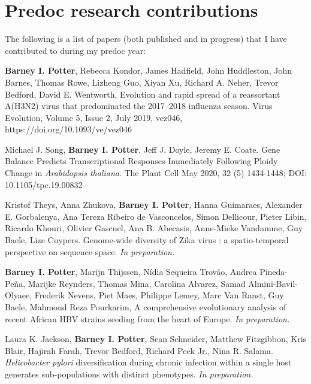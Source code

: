 \chapter{Predoc research contributions}
\label{ch:myappendix}

The following is a list of papers (both published and in progress) that I have contributed to during my predoc year:

\textbf{Barney I. Potter}, Rebecca Kondor, James Hadfield, John Huddleston, John Barnes, Thomas Rowe, Lizheng Guo, Xiyan Xu, Richard A. Neher, Trevor Bedford, David E. Wentworth, Evolution and rapid spread of a reassortant A(H3N2) virus that predominated the 2017–2018 influenza season. Virus Evolution, Volume 5, Issue 2, July 2019, vez046, https://doi.org/10.1093/ve/vez046

Michael J. Song, \textbf{Barney I. Potter}, Jeff J. Doyle, Jeremy E. Coate. Gene Balance Predicts Transcriptional Responses Immediately Following Ploidy Change in \textit{Arabidopsis thaliana}. The Plant Cell May 2020, 32 (5) 1434-1448; DOI: 10.1105/tpc.19.00832

Kristof Theys, Anna Zhukova, \textbf{Barney I. Potter}, Hanna Guimaraes, Alexander E. Gorbalenya, Ana Tereza Ribeiro de Vasconcelos, Simon Dellicour, Pieter Libin, Ricardo Khouri, Olivier Gascuel, Ana B. Abecasis, Anne-Mieke Vandamme, Guy Baele, Lize Cuypers. Genome-wide diversity of Zika virus : a spatio-temporal perspective on sequence space. \textit{In preparation.}

\textbf{Barney I. Potter}, Marijn Thijssen, N\'{i}dia Sequeira Trov\~{a}o,  Andrea Pineda-Pe\~{n}a, Marijke Reynders, Thomas Mina, Carolina Alvarez, Samad Almini-Bavil-Olyaee, Frederik Nevens, Piet Maes, Philippe Lemey, Marc Van Ranst, Guy Baele, Mahmoud Reza Pourkarim, A comprehensive evolutionary analysis of recent African HBV strains seeding from the heart of Europe. \textit{In preparation.}



Laura K. Jackson, \textbf{Barney I. Potter}, Sean Schneider, Matthew Fitzgibbon, Kris Blair, Hajirah Farah, Trevor Bedford, Richard Peek Jr., Nina R. Salama. \textit{Helicobacter pylori} diversification during chronic infection within a single host generates sub-populations with distinct phenotypes. \textit{In preparation.}


\cleardoublepage


